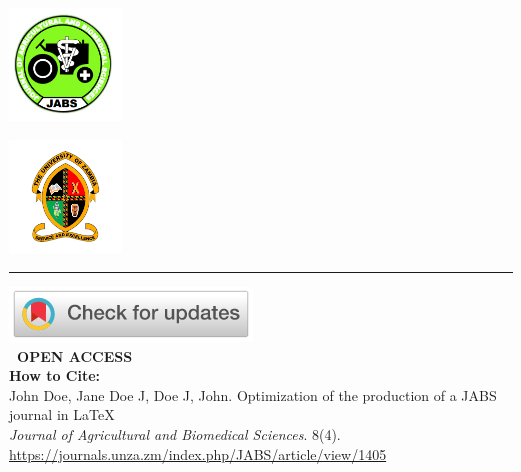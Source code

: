 \documentclass[11pt]{jabs}
\begin{document}
\vspace*{-1in} %

\pagestyle{titlepagestyle} %

\noindent
\begin{minipage}{\textwidth}

  \noindent
  \begin{minipage}[c]{0.25\textwidth}
    \includegraphics[width=2\linewidth,height=3cm,keepaspectratio]{images/logo-left.png}
  \end{minipage}%
  \hfill
  \begin{minipage}[c]{0.5\textwidth}
    \centering
    \textit{}
  \end{minipage}%
  \hfill
  \begin{minipage}[c]{0.25\textwidth}
    \raggedleft
    \includegraphics[width=2\linewidth,height=3cm,keepaspectratio]{images/logo-right.png}
  \end{minipage}

  \vspace{0.5em}
  {\color{jabsgreen}\rule{\textwidth}{2pt}}
  \vspace{1em}

  \noindent
  \begin{minipage}[t]{0.35\textwidth}
    \begin{leftinfobox}
      \small
      \href{https://example.com}{\includegraphics[width=0.9\linewidth]{images/check_for_updates.png}}\\[0.5em]
      \faUnlock \textbf{~OPEN ACCESS} \\[0.75em]
      \textbf{How to Cite:} \\
      John Doe, Jane Doe J, Doe J, John. Optimization of the production of a JABS journal in LaTeX \\
      \textit{Journal of Agricultural and Biomedical Sciences}. 8(4). \\
      \url{https://journals.unza.zm/index.php/JABS/article/view/1405} \\[1em]


\end{leftinfobox}
\end{minipage}
\end{minipage}
\end{document}
